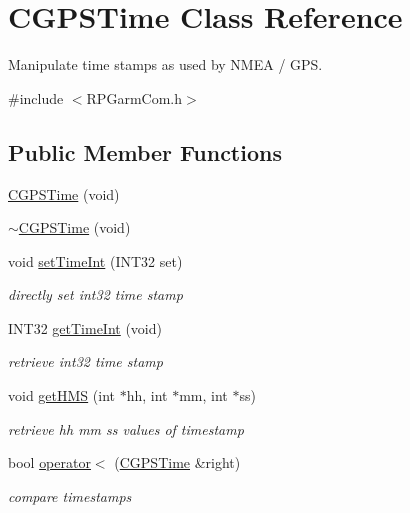 \hypertarget{classCGPSTime}{
\section{CGPSTime Class Reference}
\label{classCGPSTime}
}


Manipulate time stamps as used by NMEA / GPS.  




{\ttfamily \#include $<$RPGarmCom.h$>$}

\subsection*{Public Member Functions}
\begin{DoxyCompactItemize}
\item 
\hyperlink{classCGPSTime_ad6550fa71c7fdc603c939a21760aaec8}{CGPSTime} (void)
\item 
\hyperlink{classCGPSTime_a9ef76c34fe69327325090ef471309e7c}{$\sim$CGPSTime} (void)
\item 
void \hyperlink{classCGPSTime_aebfe89b0e1ab1cfe8a7c375a6398518c}{setTimeInt} (INT32 set)
\begin{DoxyCompactList}\small\item\em directly set int32 time stamp \item\end{DoxyCompactList}\item 
INT32 \hyperlink{classCGPSTime_a6806d2e158419bd9f7c544d18921983f}{getTimeInt} (void)
\begin{DoxyCompactList}\small\item\em retrieve int32 time stamp \item\end{DoxyCompactList}\item 
void \hyperlink{classCGPSTime_adfd79af454e601e5a3f614e9c9bda864}{getHMS} (int $\ast$hh, int $\ast$mm, int $\ast$ss)
\begin{DoxyCompactList}\small\item\em retrieve hh mm ss values of timestamp \item\end{DoxyCompactList}\item 
bool \hyperlink{classCGPSTime_af5b000156e8043e136f01579cb85d4f6}{operator$<$} (\hyperlink{classCGPSTime}{CGPSTime} \&right)
\begin{DoxyCompactList}\small\item\em compare timestamps \item\end{DoxyCompactList}\item 

\end{DoxyCompactItemize}
